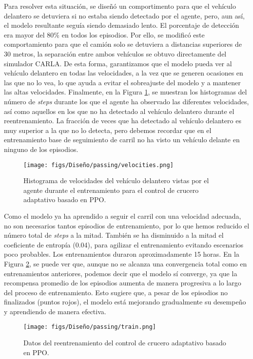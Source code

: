 Para resolver esta situación, se diseñó un comportimento para que el vehículo delantero se detuviera si no estaba siendo detectado por el agente, pero, aun así, el modelo resultante seguía siendo demasiado lento. El porcentaje de detección era mayor del 80\% en todos los episodios. Por ello, se modificó este comportamiento para que el camión solo se detuviera a distancias superiores de 30 metros, la separación entre ambos vehículos se obtuvo directamente del simulador CARLA. De esta forma, garantizamos que el modelo pueda ver al vehículo delantero en todas las velocidades, a la vez que se generen ocasiones en las que no lo vea, lo que ayuda a evitar el sobreajuste del modelo y a mantener las altas velocidades. Finalmente, en la Figura \ref{fig:velocities}, se muestran los histogramas del número de \textit{steps} durante los que el agente ha observado las diferentes velocidades, así como aquellos en los que no ha detectado al vehículo delantero durante el reentrenamiento. La fracción de veces que ha detectado al vehículo delantero es muy superior a la que no lo detecta, pero debemos recordar que en el entrenamiento base de seguimiento de carril no ha visto un vehículo delante en ninguno de los episodios.

\begin{figure}[ht]
\centering
\texttt{[image: figs/Diseño/passing/velocities.png]}
\caption{Histograma de velocidades del vehículo delantero vistas por el agente durante el entrenamiento para el control de crucero adaptativo basado en \ac{PPO}.}
\label{fig:velocities}
\end{figure}

Como el modelo ya ha aprendido a seguir el carril con una velocidad adecuada, no son necesarios tantos episodios de entrenamiento, por lo que hemos reducido el número total de \textit{steps} a la mitad. También se ha disminuido a la mitad el coeficiente de entropía (0.04), para agilizar el entrenamiento evitando escenarios poco probables. Los entrenamientos duraron aproximadamente 15 horas. En la Figura \ref{fig:train_traffic}, se puede ver que, aunque no se alcanza una convergencia total como en entrenamientos anteriores, podemos decir que el modelo sí converge, ya que la recompensa promedio de los episodios aumenta de manera progresiva a lo largo del proceso de entrenamiento. Esto sugiere que, a pesar de los episodios no finalizados (puntos rojos), el modelo está mejorando gradualmente su desempeño y aprendiendo de manera efectiva.
\begin{figure}[ht]
\centering
\texttt{[image: figs/Diseño/passing/train.png]}
\caption{Datos del reentrenamiento del control de crucero adaptativo basado en \ac{PPO}.}
\label{fig:train_traffic}
\end{figure}

